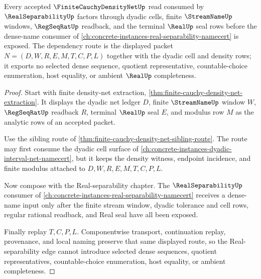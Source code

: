 \begin{theorem}
\label{thm:finite-cauchy-density-net-real-separability-route}
Every accepted $\FiniteCauchyDensityNetUp$ read consumed by $\RealSeparabilityUp$ factors through dyadic cells, finite $\StreamNameUp$ windows, $\RegSeqRatUp$ readback, and the terminal $\RealUp$ seal rows before the dense-name consumer of \autoref{ch:concrete-instances-real-separability-namecert} is exposed. The dependency route is the displayed packet $N=(D,W,R,E,M,T,C,P,L)$ together with the dyadic cell and density rows; it exports no selected dense sequence, quotient representative, countable-choice enumeration, host equality, or ambient $\RealUp$ completeness.
\end{theorem}
\begin{proof}
Start with finite density-net extraction, \autoref{thm:finite-cauchy-density-net-extraction}. It displays the dyadic net ledger $D$, finite $\StreamNameUp$ window $W$, $\RegSeqRatUp$ readback $R$, terminal $\RealUp$ seal $E$, and modulus row $M$ as the analytic rows of an accepted packet.

Use the sibling route of \autoref{thm:finite-cauchy-density-net-sibling-route}. The route may first consume the dyadic cell surface of \autoref{ch:concrete-instances-dyadic-interval-net-namecert}, but it keeps the density witness, endpoint incidence, and finite modulus attached to $D,W,R,E,M,T,C,P,L$.

Now compose with the Real-separability chapter. The $\RealSeparabilityUp$ consumer of \autoref{ch:concrete-instances-real-separability-namecert} receives a dense-name input only after the finite stream window, dyadic tolerance and cell rows, regular rational readback, and Real seal have all been exposed.

Finally replay $T,C,P,L$. Componentwise transport, continuation replay, provenance, and local naming preserve that same displayed route, so the Real-separability edge cannot introduce selected dense sequences, quotient representatives, countable-choice enumeration, host equality, or ambient completeness.
\end{proof}


